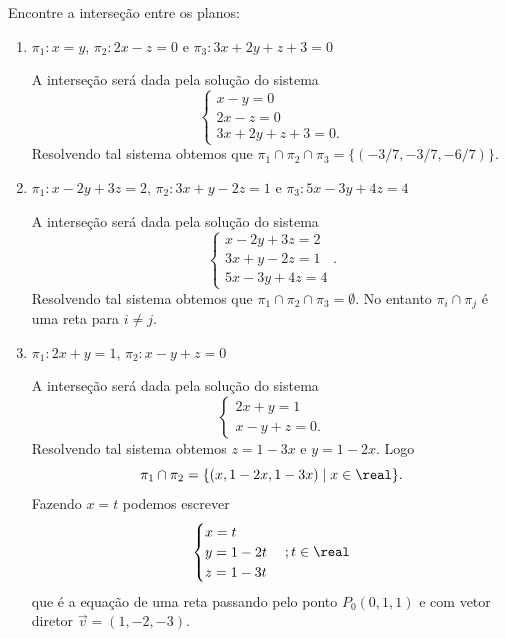 \begin{exemplos}
    Encontre a interseção entre os planos:
    \begin{enumerate}
        \item $\pi_1 : x = y$, $\pi_2 : 2x - z = 0$ e $\pi_3 : 3x + 2y + z + 3 = 0$
        \begin{solucao}
            A interseção será dada pela solução do sistema
            \[
                \begin{cases}
                    x - y = 0\\
                    2x - z = 0\\
                    3x + 2y + z + 3 = 0.
                \end{cases}
            \]
            Resolvendo tal sistema obtemos que $\pi_1\cap\pi_2\cap\pi_3 = \{(-3/7,-3/7,-6/7)\}$.
        \end{solucao}
        \item $\pi_1 : x - 2y + 3z = 2$, $\pi_2 : 3x + y - 2z = 1$ e $\pi_3 : 5x - 3y + 4z = 4$
        \begin{solucao}
            A interseção será dada pela solução do sistema
            \[
                \begin{cases}
                    x - 2y + 3z = 2\\
                    3x + y - 2z = 1\\
                    5x - 3y + 4z = 4
                \end{cases}.
            \]
            Resolvendo tal sistema obtemos que $\pi_1 \cap \pi_2 \cap \pi_3 = \emptyset$. No entanto $\pi_i \cap \pi_j$ é uma reta para $i \ne j$.
        \end{solucao}
        \item $\pi_1 : 2x + y = 1$, $\pi_2 : x - y + z = 0$
        \begin{solucao}
            A interseção será dada pela solução do sistema
            \[
                \begin{cases}
                    2x + y = 1\\
                    x - y + z = 0.
                \end{cases}
            \]
            Resolvendo tal sistema obtemos $z = 1 - 3x$ e $y = 1 - 2x$. Logo
            \[
                \pi_1\cap\pi_2 = \{(x,1 - 2x,1 - 3x) \mid x \in \real\}.
            \]
            Fazendo $x = t$ podemos escrever
            \[
                \begin{cases}
                    x = t\\
                    y = 1 - 2t\\
                    z = 1 - 3t
                \end{cases}; t \in \real
            \]
            que é a equação de uma reta passando pelo ponto $P_0(0,1,1)$ e com vetor diretor $\vec{v} = (1,-2,-3)$.
        \end{solucao}
    \end{enumerate}
\end{exemplos}


